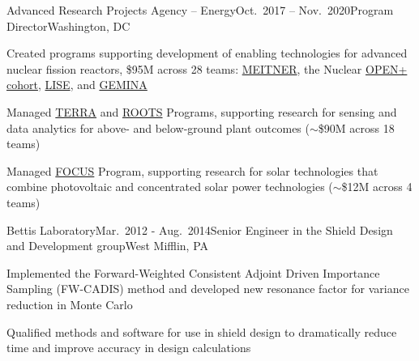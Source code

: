\begin{rSubsection}{Advanced Research Projects Agency -- Energy}{Oct.\ 2017 -- Nov.\ 2020}{Program Director}{Washington, DC}
\item Created programs supporting development of enabling technologies for advanced nuclear fission reactors, \$95M across 28 teams: 
\href{https://arpa-e.energy.gov/?q=arpa-e-programs/meitner}{MEITNER}, the
Nuclear
\href{https://arpa-e.energy.gov/?q=news-item/arpa-e-announces-12-million-five-projects-nuclear-materials-science}{OPEN+
cohort},
\href{https://arpa-e.energy.gov/?q=news-item/arpa-e-innovating-through-unconventional-ideas}{LISE}, and  \href{https://arpa-e.energy.gov/technologies/programs/gemina}{GEMINA}
\item Managed \href{https://arpa-e.energy.gov/?q=arpa-e-programs/terra}{TERRA} and \href{https://arpa-e.energy.gov/?q=arpa-e-programs/roots}{ROOTS} Programs, supporting research for sensing and data analytics for above- and below-ground plant outcomes ($\sim$\$90M across 18 teams)
\item Managed \href{https://arpa-e.energy.gov/?q=arpa-e-programs/focus}{FOCUS} Program, supporting research for solar technologies that combine photovoltaic and concentrated solar power technologies ($\sim$\$12M across 4 teams)
\end{rSubsection}


\begin{rSubsection}{Bettis Laboratory}{Mar.\ 2012 - Aug.\ 2014}{Senior Engineer in the Shield Design and Development group}{West Mifflin, PA}
\item Implemented the Forward-Weighted Consistent Adjoint Driven Importance Sampling (FW-CADIS) method and developed new resonance factor for variance reduction in Monte Carlo
\item Qualified methods and software for use in shield design to dramatically reduce time and improve accuracy in design calculations
\end{rSubsection}


